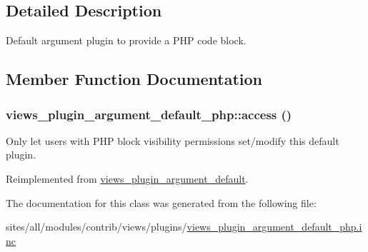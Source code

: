 \subsection{Detailed Description}
Default argument plugin to provide a PHP code block. 

\subsection{Member Function Documentation}
\hypertarget{classviews__plugin__argument__default__php_ff864fbd2dcbea7ecd3589429bbf3a2a}{
\subsubsection[{access}]{\setlength{\rightskip}{0pt plus 5cm}views\_\-plugin\_\-argument\_\-default\_\-php::access ()}}
\label{classviews__plugin__argument__default__php_ff864fbd2dcbea7ecd3589429bbf3a2a}


Only let users with PHP block visibility permissions set/modify this default plugin. 

Reimplemented from \hyperlink{classviews__plugin__argument__default_47b0a69da2fb0e45c25aa9c8727f912f}{views\_\-plugin\_\-argument\_\-default}.

The documentation for this class was generated from the following file:\begin{CompactItemize}
\item 
sites/all/modules/contrib/views/plugins/\hyperlink{views__plugin__argument__default__php_8inc}{views\_\-plugin\_\-argument\_\-default\_\-php.inc}\end{CompactItemize}
